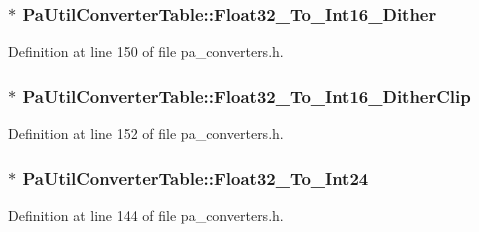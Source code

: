 \subsubsection[{\texorpdfstring{Float32\+\_\+\+To\+\_\+\+Int16\+\_\+\+Dither}{Float32_To_Int16_Dither}}]{$\ast$ Pa\+Util\+Converter\+Table\+::\+Float32\+\_\+\+To\+\_\+\+Int16\+\_\+\+Dither}\hypertarget{struct_pa_util_converter_table_a6f44a10b6e0fdd6703ddbf222824680b}{}\label{struct_pa_util_converter_table_a6f44a10b6e0fdd6703ddbf222824680b}


Definition at line 150 of file pa\+\_\+converters.\+h.

\subsubsection[{\texorpdfstring{Float32\+\_\+\+To\+\_\+\+Int16\+\_\+\+Dither\+Clip}{Float32_To_Int16_DitherClip}}]{$\ast$ Pa\+Util\+Converter\+Table\+::\+Float32\+\_\+\+To\+\_\+\+Int16\+\_\+\+Dither\+Clip}\hypertarget{struct_pa_util_converter_table_aff1328d2334cef2836d4ff6dc7f5077d}{}\label{struct_pa_util_converter_table_aff1328d2334cef2836d4ff6dc7f5077d}


Definition at line 152 of file pa\+\_\+converters.\+h.

\subsubsection[{\texorpdfstring{Float32\+\_\+\+To\+\_\+\+Int24}{Float32_To_Int24}}]{$\ast$ Pa\+Util\+Converter\+Table\+::\+Float32\+\_\+\+To\+\_\+\+Int24}\hypertarget{struct_pa_util_converter_table_a1d8ec1d1317b8bee63c1528282046394}{}\label{struct_pa_util_converter_table_a1d8ec1d1317b8bee63c1528282046394}


Definition at line 144 of file pa\+\_\+converters.\+h.

